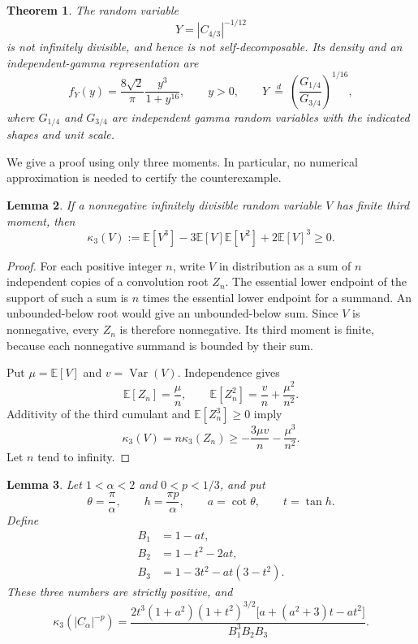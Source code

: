 \documentclass[11pt,a4paper]{article}
\newtheorem{theorem}{Theorem}[section]
\newtheorem{lemma}[theorem]{Lemma}
\theoremstyle{definition}
\theoremstyle{remark}
\newcommand{\E}{\mathbb E}
\DeclareMathOperator{\Var}{Var}
\numberwithin{equation}{section}
\begin{document}
\begin{theorem}
\label{thm:yyy-explicit}
The random variable
\[
 Y=|C_{4/3}|^{-1/12}
\]
is not infinitely divisible, and hence is not self-decomposable.
Its density and an independent-gamma representation are
\begin{equation}
 f_Y(y)=\frac{8\sqrt2}{\pi}\frac{y^3}{1+y^{16}},\qquad y>0,
 \qquad
 Y\ \stackrel{d}{=}\
 \left(\frac{G_{1/4}}{G_{3/4}}\right)^{1/16},
 \label{eq:yyy-gb2}
\end{equation}
where $G_{1/4}$ and $G_{3/4}$ are independent gamma random variables
with the indicated shapes and unit scale.
\end{theorem}

We give a proof using only three moments. In particular, no numerical
approximation is needed to certify the counterexample.

\begin{lemma}
\label{lem:yyy-third-cumulant}
If a nonnegative infinitely divisible random variable $V$ has finite
third moment, then
\[
 \kappa_3(V):=\E[V^3]-3\E[V]\E[V^2]+2\E[V]^3\ge0.
\]
\end{lemma}

\begin{proof}
For each positive integer $n$, write $V$ in distribution as a sum of
$n$ independent copies of a convolution root $Z_n$. The essential lower
endpoint of the support of such a sum is $n$ times the essential lower
endpoint for a summand. An unbounded-below root would give an
unbounded-below sum. Since $V$ is nonnegative, every $Z_n$ is therefore
nonnegative. Its third moment is finite, because each nonnegative
summand is bounded by their sum.

Put $\mu=\E[V]$ and $v=\Var(V)$. Independence gives
\[
 \E[Z_n]=\frac{\mu}{n},\qquad
 \E[Z_n^2]=\frac{v}{n}+\frac{\mu^2}{n^2}.
\]
Additivity of the third cumulant and $\E[Z_n^3]\ge0$ imply
\[
 \kappa_3(V)=n\kappa_3(Z_n)
 \ge -\frac{3\mu v}{n}-\frac{\mu^3}{n^2}.
\]
Let $n$ tend to infinity.
\end{proof}

\begin{lemma}
\label{lem:yyy-factorization}
Let $1<\alpha<2$ and $0<p<1/3$, and put
\[
 \theta=\frac{\pi}{\alpha},\qquad
 h=\frac{\pi p}{\alpha},\qquad
 a=\cot\theta,\qquad t=\tan h.
\]
Define
\begin{align*}
 B_1&=1-at,\\
 B_2&=1-t^2-2at,\\
 B_3&=1-3t^2-at(3-t^2).
\end{align*}
These three numbers are strictly positive, and
\begin{equation}
 \kappa_3(|C_\alpha|^{-p})
 =\frac{2t^3(1+a^2)(1+t^2)^{3/2}
       \bigl[a+(a^2+3)t-at^2\bigr]}
       {B_1^3B_2B_3}.
 \label{eq:yyy-cumulant-factor}
\end{equation}
\end{lemma}
\end{document}
